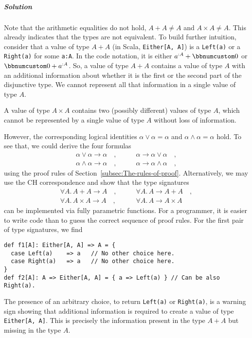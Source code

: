 \subparagraph{Solution}

Note that the arithmetic equalities do not hold, $A+A\neq A$ and
$A\times A\ne A$. This already indicates that the types are not equivalent.
To build further intuition, consider that a value of type $A+A$ (in
Scala, \lstinline!Either[A, A]!) is a \lstinline!Left(a)! or a \lstinline!Right(a)!
for some \lstinline!a:A!. In the code notation, it is either $a^{:A}+\bbnum 0$
or $\bbnum 0+a^{:A}$. So, a value of type $A+A$ contains a value
of type $A$ with an additional information about whether it is the
first or the second part of the disjunctive type. We cannot represent
all that information in a single value of type $A$. 

A value of type $A\times A$ contains two (possibly different) values
of type $A$, which cannot be represented by a single value of type
$A$ without loss of information.

However, the corresponding logical identities $\alpha\vee\alpha=\alpha$
and $\alpha\wedge\alpha=\alpha$ hold. To see that, we could derive
the four formulas
\begin{align*}
\alpha\vee\alpha\rightarrow\alpha\quad, & \quad\quad\alpha\rightarrow\alpha\vee\alpha\quad,\\
\alpha\wedge\alpha\rightarrow\alpha\quad, & \quad\quad\alpha\rightarrow\alpha\wedge\alpha\quad,
\end{align*}
using the proof rules of Section~\ref{subsec:The-rules-of-proof}.
Alternatively, we may use the CH correspondence and show that the
type signatures
\begin{align*}
\forall A.\,A+A\rightarrow A\quad, & \quad\quad\forall A.\,A\rightarrow A+A\quad,\\
\forall A.\,A\times A\rightarrow A\quad, & \quad\quad\forall A.\,A\rightarrow A\times A\quad
\end{align*}
can be implemented via fully parametric functions. For a programmer,
it is easier to write code than to guess the correct sequence of proof
rules. For the first pair of type signatures, we find
\begin{lstlisting}
def f1[A]: Either[A, A] => A = {
  case Left(a)    => a   // No other choice here.
  case Right(a)   => a   // No other choice here.
}
def f2[A]: A => Either[A, A] = { a => Left(a) } // Can be also Right(a).
\end{lstlisting}
The presence of an arbitrary choice, to return \lstinline!Left(a)!
or \lstinline!Right(a)!, is a warning sign showing that additional
information is required to create a value of type \lstinline!Either[A, A]!.
This is precisely the information present in the type $A+A$ but missing
in the type $A$.

